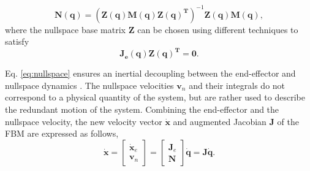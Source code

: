 \documentclass[../main.tex]{subfiles}
\begin{document}
\begin{equation}
    \label{eq:nullspace}
    \bm{N(q)} = {\left( \bm{Z(q)M(q)Z(q)^{T}}  \right)}^{-1} \bm{Z(q)M(q)},
\end{equation} 
 where the nullspace base matrix $\bm{Z}$ can be chosen using different techniques \cite{chen1993consistent} to satisfy
\begin{equation}
    \label{eq:nullspace_dyn_consistency}
    \bm{J_e(q)Z(q)^T} = \bm{0}.
\end{equation} \par 
Eq. \eqref{eq:nullspace} ensures an inertial decoupling between the end-effector and nullspace dynamics \cite{park1999}. The nullspace velocities $\bm{v}_n$ and their integrals do not correspond to a physical quantity of the system, but are rather used to describe the redundant motion of the system. Combining the end-effector and the nullspace velocity, the new velocity vector $\dot{\bm{x}}$ and augmented Jacobian $\bm{J}$ of the FBM are expressed as follows,
\begin{equation}
    \label{eq:Jac}
   \dot{\bm{x}}= \begin{bmatrix}
\dot{\bm{x}}_e\\
\bm{v}_n
\end{bmatrix} = \begin{bmatrix}
\bm{J}_e\\
\bm{N}
\end{bmatrix}  \dot{\bm{q}} =
{\bm{J}}
\dot{\bm{q}}.
\end{equation} \par
\end{document}

